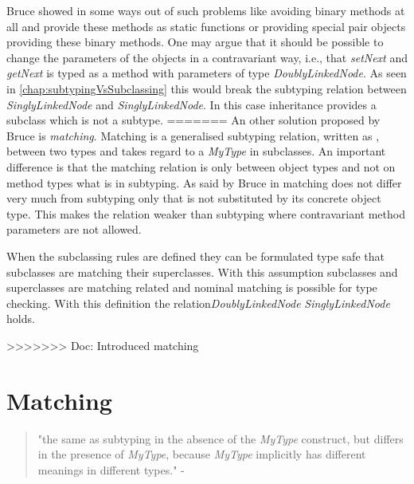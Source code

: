 Bruce showed in \cite{bruce_binary_1995} some ways out of such problems
like avoiding binary methods at all and provide these methods as static
functions or providing special pair objects providing these binary
methods. One may argue that it should be possible to change the parameters
of the objects in a contravariant way, i.e., that \emph{setNext}
and \emph{getNext} is typed as a method with parameters of type
\emph{DoublyLinkedNode}. As seen in \autoref{chap:subtypingVsSubclassing}
this would break the subtyping relation between \emph{SinglyLinkedNode}
and \emph{SinglyLinkedNode}. In this case inheritance provides a subclass
which is not a subtype.
=======
An other solution proposed by Bruce \cite{bruce_binary_1995} is
\emph{matching}. Matching is a generalised subtyping relation, written
as \match, between two types and takes regard to a \emph{MyType} in
subclasses. An important difference is that the matching relation is only
between object types and not on method types what is in subtyping. As
said by Bruce in \cite{bruce_foundations_2002} matching does not differ
very much from subtyping only that \MyType is not substituted by its
concrete object type. This makes the relation weaker than subtyping
where contravariant method parameters are not allowed.

When the subclassing rules are defined they can be formulated
type safe that subclasses are matching their superclasses. With
this assumption subclasses and superclasses are matching related and
nominal matching is possible for type checking. With this definition
the relation\emph{DoublyLinkedNode} \match \emph{SinglyLinkedNode} holds.





>>>>>>> Doc: Introduced matching

\section{Matching}
\begin{quotation}
"the same as subtyping in the absence of the \emph{MyType}
construct, but differs in the presence of \emph{MyType}, because
\emph{MyType} implicitly has different meanings in different types." -
\cite{bruce_foundations_2002}
\end{quotation}

